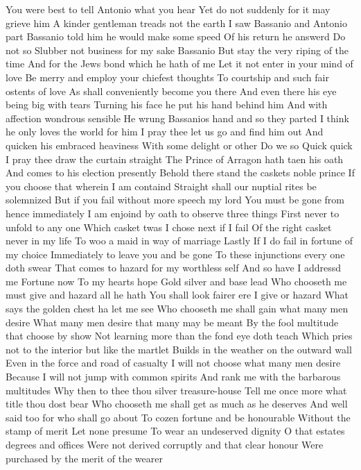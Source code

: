 You were best to tell Antonio what you hear
Yet do not suddenly for it may grieve him
A kinder gentleman treads not the earth
I saw Bassanio and Antonio part
Bassanio told him he would make some speed
Of his return he answerd Do not so
Slubber not business for my sake Bassanio
But stay the very riping of the time
And for the Jews bond which he hath of me
Let it not enter in your mind of love
Be merry and employ your chiefest thoughts
To courtship and such fair ostents of love
As shall conveniently become you there
And even there his eye being big with tears
Turning his face he put his hand behind him
And with affection wondrous sensible
He wrung Bassanios hand and so they parted
I think he only loves the world for him
I pray thee let us go and find him out
And quicken his embraced heaviness
With some delight or other
Do we so
Quick quick I pray thee draw the curtain straight
The Prince of Arragon hath taen his oath
And comes to his election presently
Behold there stand the caskets noble prince
If you choose that wherein I am containd
Straight shall our nuptial rites be solemnized
But if you fail without more speech my lord
You must be gone from hence immediately
I am enjoind by oath to observe three things
First never to unfold to any one
Which casket twas I chose next if I fail
Of the right casket never in my life
To woo a maid in way of marriage Lastly
If I do fail in fortune of my choice
Immediately to leave you and be gone
To these injunctions every one doth swear
That comes to hazard for my worthless self
And so have I addressd me Fortune now
To my hearts hope Gold silver and base lead
Who chooseth me must give and hazard all he hath
You shall look fairer ere I give or hazard
What says the golden chest ha let me see
Who chooseth me shall gain what many men desire
What many men desire that many may be meant
By the fool multitude that choose by show
Not learning more than the fond eye doth teach
Which pries not to the interior but like the martlet
Builds in the weather on the outward wall
Even in the force and road of casualty
I will not choose what many men desire
Because I will not jump with common spirits
And rank me with the barbarous multitudes
Why then to thee thou silver treasure-house
Tell me once more what title thou dost bear
Who chooseth me shall get as much as he deserves
And well said too for who shall go about
To cozen fortune and be honourable
Without the stamp of merit Let none presume
To wear an undeserved dignity
O that estates degrees and offices
Were not derived corruptly and that clear honour
Were purchased by the merit of the wearer
